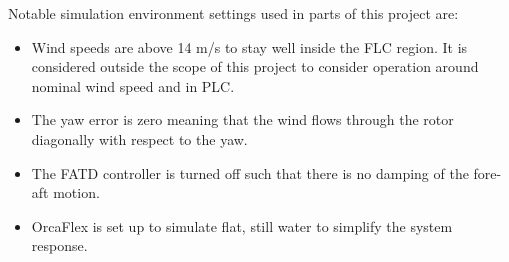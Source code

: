 Notable simulation environment settings used in parts of this project are:
\begin{itemize}
	\item Wind speeds are above 14 m/s to stay well inside the FLC region. It is considered outside the scope of this project to consider operation around nominal wind speed and in PLC.
	\item The yaw error is zero meaning that the wind flows through the rotor diagonally with respect to the yaw.
	\item The FATD controller is turned off such that there is no damping of the fore-aft motion.
	\item OrcaFlex is set up to simulate flat, still water to simplify the system response. 
\end{itemize}

